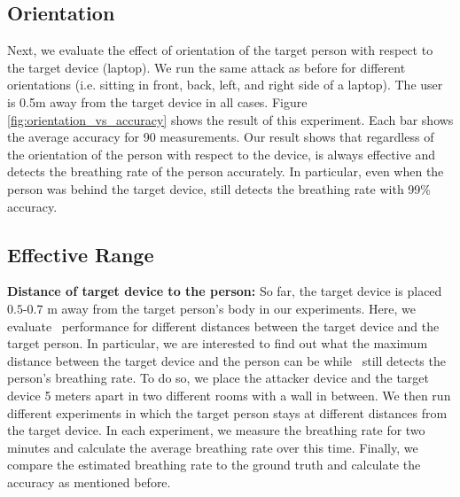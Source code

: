 

\subsection{Orientation}
Next, we evaluate the effect of orientation of the target person with respect to the target device (laptop). We run the same attack as before for different orientations (i.e. sitting in front, back, left, and right side of a laptop). The user is 0.5m away from the target device in all cases. Figure \ref{fig:orientation_vs_accuracy} shows the result of this experiment. Each bar shows the average accuracy for 90 measurements. Our result shows that regardless of the orientation of the person with respect to the device, \wisneak is always effective and detects the breathing rate of the person accurately. In particular, even when the person was behind the target device, \wisneak still detects the breathing rate with 99\% accuracy.




\subsection{Effective Range}

\textbf{Distance of target device to the person:} So far, the target device is placed $0.5$-$0.7$ m away from the target person's body in our experiments. Here, we evaluate \wisneak\ performance for different distances between the target device and the target person. In particular, we are interested to find out what the maximum distance between the target device and the person can be while \wisneak\ still detects the person's breathing rate. To do so, we place the attacker device and the target device 5 meters apart in two different rooms with a wall in between. We then run different experiments in which the target person stays at different distances from the target device. In each experiment, we measure the breathing rate for two minutes and calculate the average breathing rate over this time. Finally, we compare the estimated breathing rate to the ground truth and calculate the accuracy as mentioned before. 

